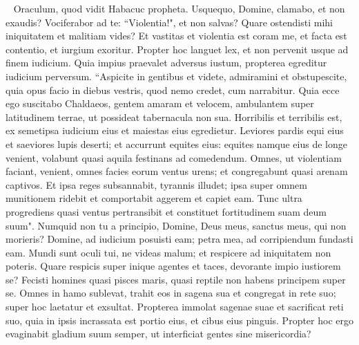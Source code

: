 
\begin{biblechapter}   
\verse Oraculum, quod vidit Habacuc propheta. 
\verse Usquequo, Domine, clamabo, et non exaudis? Vociferabor ad te: “Violentia!", et non salvas? 
\verse Quare ostendisti mihi iniquitatem et malitiam vides? Et vastitas et violentia est coram me, et facta est contentio, et iurgium exoritur. 
\verse Propter hoc languet lex, et non pervenit usque ad finem iudicium. Quia impius praevalet adversus iustum, propterea egreditur iudicium perversum. 
\verse “Aspicite in gentibus et videte, admiramini et obstupescite, quia opus facio in diebus vestris, quod nemo credet, cum narrabitur. 
\verse Quia ecce ego suscitabo Chaldaeos, gentem amaram et velocem, ambulantem super latitudinem terrae, ut possideat tabernacula non sua. 
\verse Horribilis et terribilis est, ex semetipsa iudicium eius et maiestas eius egredietur. 
\verse Leviores pardis equi eius et saeviores lupis deserti; et accurrunt equites eius: equites namque eius de longe venient, volabunt quasi aquila festinans ad comedendum. 
\verse Omnes, ut violentiam faciant, venient, omnes facies eorum ventus urens; et congregabunt quasi arenam captivos. 
\verse Et ipsa reges subsannabit, tyrannis illudet; ipsa super omnem munitionem ridebit et comportabit aggerem et capiet eam. 
\verse Tunc ultra progrediens quasi ventus pertransibit et constituet fortitudinem suam deum suum". 
\verse Numquid non tu a principio, Domine, Deus meus, sanctus meus, qui non morieris? Domine, ad iudicium posuisti eam; petra mea, ad corripiendum fundasti eam. 
\verse Mundi sunt oculi tui, ne videas malum; et respicere ad iniquitatem non poteris. Quare respicis super inique agentes et taces, devorante impio iustiorem se? 
\verse Fecisti homines quasi pisces maris, quasi reptile non habens principem super se. 
\verse Omnes in hamo sublevat, trahit eos in sagena sua et congregat in rete suo; super hoc laetatur et exsultat. 
\verse Propterea immolat sagenae suae et sacrificat reti suo, quia in ipsis incrassata est portio eius, et cibus eius pinguis. 
\verse Propter hoc ergo evaginabit gladium suum semper, ut interficiat gentes sine misericordia? 
\end{biblechapter}

